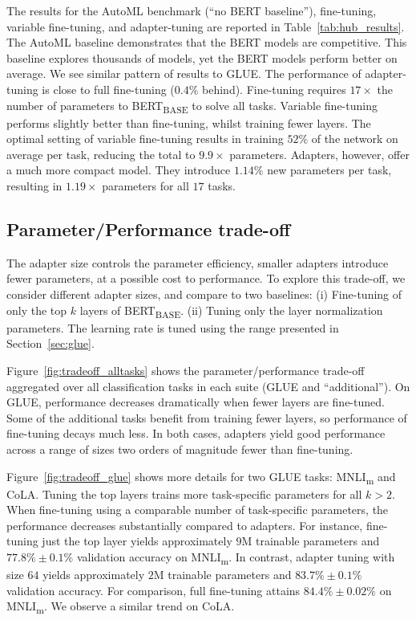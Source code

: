 The results for the AutoML benchmark (``no BERT baseline''), fine-tuning, variable fine-tuning, and adapter-tuning are reported in Table~\ref{tab:hub_results}.
The AutoML baseline demonstrates that the BERT models are competitive.
This baseline explores thousands of models, yet the BERT models perform better on average.
We see similar pattern of results to GLUE.
The performance of adapter-tuning is close to full fine-tuning ($0.4\%$ behind).
Fine-tuning requires $17\times$ the number of parameters to BERT\textsubscript{BASE} to solve all tasks.
Variable fine-tuning performs slightly better than fine-tuning, whilst training fewer layers.
The optimal setting of variable fine-tuning results in training $52\%$ of the network on average per task, reducing the total to $9.9\times$ parameters.
Adapters, however, offer a much more compact model.
They introduce $1.14\%$ new parameters per task, resulting in $1.19\times$ parameters for all $17$ tasks.

\subsection{Parameter/Performance trade-off\label{sec:param_efficiency}}

The adapter size controls the parameter efficiency, smaller adapters introduce fewer parameters, at a possible cost to performance.
To explore this trade-off, we consider different adapter sizes, and compare to two baselines:
(i) Fine-tuning of only the top $k$ layers of BERT\textsubscript{BASE}.
(ii) Tuning only the layer normalization parameters.
The learning rate is tuned using the range presented in Section~\ref{sec:glue}.

Figure~\ref{fig:tradeoff_alltasks} shows the parameter/performance trade-off aggregated over all classification tasks in each suite (GLUE and ``additional'').
On GLUE, performance decreases dramatically when fewer layers are fine-tuned.
Some of the additional tasks benefit from training fewer layers, so performance of fine-tuning decays much less.
In both cases, adapters yield good performance across a range of sizes two orders of magnitude fewer than fine-tuning.

Figure~\ref{fig:tradeoff_glue} shows more details for two GLUE tasks: MNLI\textsubscript{m} and CoLA.
Tuning the top layers trains more task-specific parameters for all $k>2$.
When fine-tuning using a comparable number of task-specific parameters, the performance decreases substantially compared to adapters.
For instance, fine-tuning just the top layer yields approximately $9$M trainable parameters and $77.8 \% \pm 0.1 \%$ validation accuracy on MNLI\textsubscript{m}.
In contrast, adapter tuning with size $64$ yields approximately $2$M trainable parameters and $83.7\% \pm 0.1 \%$  validation accuracy.
For comparison, full fine-tuning attains $84.4 \% \pm 0.02 \%$ on MNLI\textsubscript{m}.
We observe a similar trend on CoLA.

